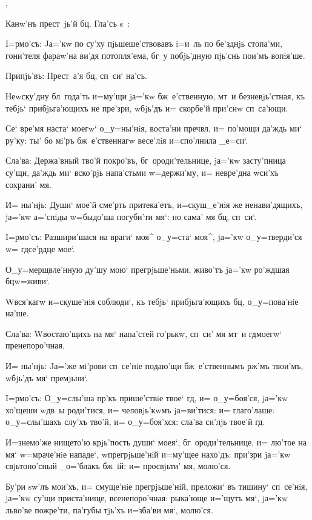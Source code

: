 , 

Канw'нъ прест~jь'й бц. Гла'съ s~:


I=рмо'съ: Jа='кw по су'ху пjьшеше'ствовавъ i=и~ль по 
бе'зднjь стопа'ми, гони'теля фараw'на ви'дя потопля'ема, 
бг~у побjь'дную пjь'снь пои'мъ вопiя'ше.

Припjь'въ: Прест~а'я бц, сп~си` на'съ.

Неwску'дну бл~года'ть и=му'щи jа='кw бж~е'ственную, 
мт~и безневjь'стная, къ тебjь` прибjьга'ющихъ не пре'зри, 
w\т бjь'дъ и= скорбе'й при'снw сп~са'ющи.

Се` вре'мя наста` моегw` о_у=ны'нiя, воста'ни 
преч вл, и= по'мощи да'ждь ми` ру'ку: ты' бо 
мi'ръ бж~е'ственнагw весе'лiя и=спо'лнила _е=си`.

Сла'ва: Держа'вный тво'й покро'въ, бг~ороди'тельнице, 
jа='кw засту'пница су'щи, да'ждь ми` вско'рjь напа'стьми 
w=держи'му, и= невре'дна w\т си'хъ сохрани' мя.

И= ны'нjь: Души` мое'й сме'рть притека'етъ, 
и=скуш_е'нiя же ненави'дящихъ, jа='кw а='спiды w=быдо'ша 
погуби'ти мя`: но сама' мя бц, сп~си`.


I=рмо'съ: Разшири'шася на враги` моя^ о_у=ста` моя^, 
jа='кw о_у=тверди'ся w= гд се'рдце мое`.

О_у=мерщвле'нную ду'шу мою` прегрjьше'ньми, живо'тъ 
jа='кw ро'ждшая бц w=живи`.

W\т вся'кагw и=скуше'нiя соблюди`, къ тебjь` 
прибjьга'ющихъ бц, о_у=пова'нiе на'ше.

Сла'ва: W\т востаю'щихъ на мя` напа'стей го'рькw, 
сп~си' мя мт~и гд моегw` пренепоро'чная. 

И= ны'нjь: Jа='же мi'рови сп~се'нiе подаю'щи 
бж~е'ственнымъ рж'мъ твои'мъ, w\т бjь'дъ мя` 
премjьни`.


I=рмо'съ: О_у=слы'ша пр'къ прише'ствiе твое` 
гд, и= о_у=боя'ся, jа='кw хо'щеши w\т дв~ы роди'тися, 
и= человjь'кwмъ jа=ви'тися: и= глаго'лаше: о_у=слы'шахъ 
слу'хъ тво'й, и= о_у=боя'хся: сла'ва си'лjь твое'й гд.

И=знемо'же нището'ю крjь'пость души` моея`, 
бг~ороди'тельнице, и= лю'тое на мя` w=мраче'нiе нападе`, 
w\т прегрjьше'нiй и=му'щее нахо'дъ: при'зри jа='кw 
свjьтоно'сный _о='блакъ бж~iй: и= просвjьти' мя, молю'ся.

Бу'ри sw'лъ мои'хъ, и= смуще'нiе прегрjьше'нiй, 
преложи` въ тишину` сп~се'нiя, jа='кw су'щи приста'нище, 
всенепоро'чная: рыка'юще и='щутъ мя`, jа='кw льво'ве 
пожре'ти, па'губы тjь'хъ и=зба'ви мя`, молю'ся.

